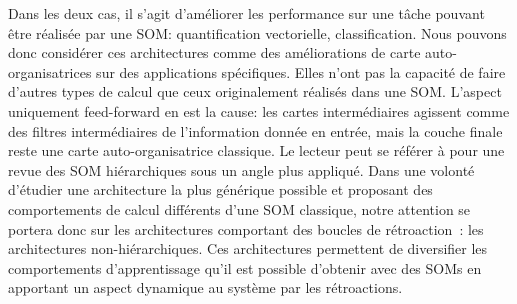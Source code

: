 \documentclass[../main]{subfiles}
\begin{document}
Dans les deux cas, il s'agit d'améliorer les performance sur une tâche pouvant être réalisée par une SOM: quantification vectorielle, classification.
Nous pouvons donc considérer ces architectures comme des améliorations de carte auto-organisatrices sur des applications spécifiques.
Elles n'ont pas la capacité de faire d'autres types de calcul que ceux originalement réalisés dans une SOM.
L'aspect uniquement feed-forward en est la cause: les cartes intermédiaires agissent comme des filtres intermédiaires de l'information donnée en entrée, mais la couche finale reste une carte auto-organisatrice classique.
Le lecteur peut se référer à \cite{johnsson_spatial_2012} pour une revue des SOM hiérarchiques sous un angle plus appliqué.
Dans une volonté d'étudier une architecture la plus générique possible et proposant des comportements de calcul différents d'une SOM classique, notre attention se portera donc sur les architectures comportant des boucles de rétroaction~: les architectures non-hiérarchiques. Ces architectures permettent de diversifier les comportements d'apprentissage qu'il est possible d'obtenir avec des SOMs en apportant un aspect dynamique au système par les rétroactions. 



\end{document}
